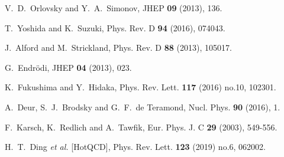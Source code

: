 \begin{thebibliography}{1000}
V.~D.~Orlovsky and Y.~A.~Simonov,
JHEP \textbf{09} (2013), 136.

T.~Yoshida and K.~Suzuki,
Phys. Rev. D \textbf{94} (2016), 074043.

J.~Alford and M.~Strickland,
Phys. Rev. D \textbf{88} (2013), 105017.




G.~Endr\"odi,
JHEP \textbf{04} (2013), 023.


K.~Fukushima and Y.~Hidaka,
Phys. Rev. Lett. \textbf{117} (2016) no.10, 102301.


A.~Deur, S.~J.~Brodsky and G.~F.~de Teramond,
Nucl. Phys. \textbf{90} (2016), 1.



F.~Karsch, K.~Redlich and A.~Tawfik,
Eur. Phys. J. C \textbf{29} (2003), 549-556.

H.~T.~Ding \textit{et al.} [HotQCD],
Phys. Rev. Lett. \textbf{123} (2019) no.6, 062002.





\end{thebibliography}
